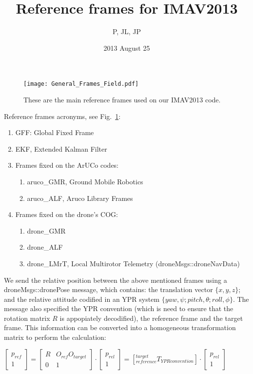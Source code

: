 \documentclass[a4paper,10pt]{article}
\title{Reference frames for {IMAV2013}}
\author{P, JL, JP}
\date{2013 August 25}
\begin{document}
\maketitle

\begin{figure}[tbh!]
\centering
\texttt{[image: General\_Frames\_Field.pdf]}
\caption{
	  These are the main reference frames used on our IMAV2013 code.
	  } \label{fig:IMAV_Frames}
\end{figure}

Reference frames acronyms, see Fig.~\ref{fig:IMAV_Frames}:
\begin{enumerate}
 \item GFF: Global Fixed Frame
 \item {EKF}, Extended Kalman Filter
 \item Frames fixed on the {ArUCo} codes:
 \begin{enumerate}
  \item aruco\_{GMR}, Ground Mobile Robotics
  \item aruco\_{ALF}, Aruco Library Frames
 \end{enumerate}
 \item Frames fixed on the drone's {COG}:
 \begin{enumerate}
  \item drone\_{GMR}
  \item drone\_{ALF}
  \item drone\_{LMrT}, Local Multirotor Telemetry (droneMsgs::droneNavData)
 \end{enumerate}
\end{enumerate}

We send the relative position between the above mentioned frames using a droneMsgs::dronePose message, which contains:
the translation vector $\{ x, y, z\}$; and the relative attitude codified in an YPR system $\{ yaw, \psi; pitch, \theta; roll, \phi\}$.
The message also specified the YPR convention (which is need to ensure that the rotation matrix $R$ is appopiately decodified),
the reference frame and the target frame. This information can be converted into a homogeneous transformation matrix to perform
the calculation:

$ \left[
  \begin{array}{c}
   p_{ref} \\
   1
  \end{array}
  \right]
  =
  \left[
  \begin{array}{cc}
   R & O_{ref}O_{target}\\
   0 & 1 
  \end{array} 
  \right]
  \cdot
  \left[
  \begin{array}{c}
   p_{rel} \\
   1
  \end{array}
  \right]
  =
  \left[
  ^{target}_{reference}T_{YPR convention}
  \right]
  \cdot
  \left[
  \begin{array}{c}
   p_{rel} \\
   1
  \end{array}
  \right]
  $
\end{document}
